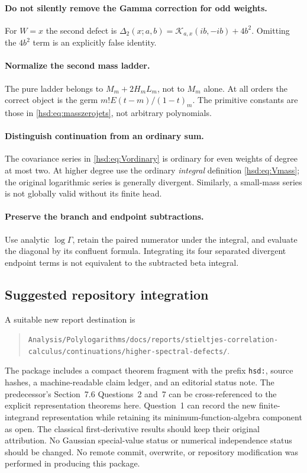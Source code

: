\documentclass[11pt]{article}
\numberwithin{equation}{section}
\theoremstyle{definition}\newtheorem{definition}[theorem]{Definition}
\theoremstyle{remark}\newtheorem{remark}[theorem]{Remark}
\newcommand{\KK}{\mathcal K}
\newcommand{\src}[1]{\nolinkurl{#1}}
\begin{document}
\paragraph{Do not silently remove the Gamma correction for odd weights.}
For $W=x$ the second defect is
$\Delta_2(x;a,b)=\KK_{a,x}(ib,-ib)+4b^2$.
Omitting the $4b^2$ term is an explicitly false identity.

\paragraph{Normalize the second mass ladder.}
The pure ladder belongs to $M_m+2H_mL_m$, not to $M_m$ alone.
At all orders the correct object is the germ
$m!E(t-m)/(1-t)_m$. The primitive constants are those in
\eqref{hsd:eq:masszerojets}, not arbitrary polynomials.

\paragraph{Distinguish continuation from an ordinary sum.}
The covariance series in \eqref{hsd:eq:Vordinary} is ordinary for even
weights of degree at most two. At higher degree use the ordinary
\emph{integral} definition \eqref{hsd:eq:Vmass}; the original logarithmic
series is generally divergent. Similarly, a small-mass series is not
globally valid without its finite head.

\paragraph{Preserve the branch and endpoint subtractions.}
Use analytic $\log\Gamma$, retain the paired numerator under the
integral, and evaluate the diagonal by its confluent formula. Integrating
its four separated divergent endpoint terms is not equivalent to the
subtracted beta integral.

\subsection{Suggested repository integration}
A suitable new report destination is
\begin{quote}\small
\src{Analysis/Polylogarithms/docs/reports/stieltjes-correlation-calculus/continuations/higher-spectral-defects/}.
\end{quote}
The package includes a compact theorem fragment with the prefix
\src{hsd:}, source hashes, a machine-readable claim ledger, and an
editorial status note. The predecessor's Section~7.6 Questions~2 and~7
can be cross-referenced to the explicit representation theorems here.
Question~1 can record the new finite-integrand representation while
retaining its minimum-function-algebra component as open. The classical
first-derivative results should keep their original attribution. No
Gaussian special-value status or numerical independence status should
be changed. No remote commit, overwrite, or repository modification
was performed in producing this package.
\end{document}
